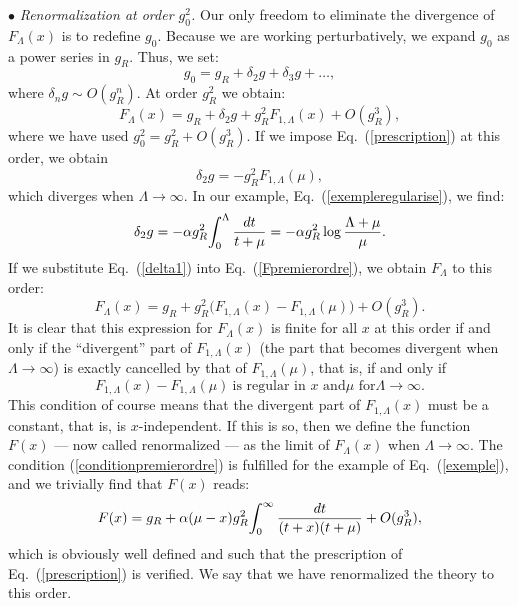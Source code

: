\documentclass[floatfix,twocolumn,preprintnumbers,amsmath,amssymb,prb]{revtex4}
\begin{document}
$\bullet$ {\it Renormalization at order $g_0^2$.} Our only freedom to eliminate the divergence of $F_\Lambda(x)$ is to redefine $g_0$. Because
we are working perturbatively, we expand $g_0$ as a power series
in $g_R$. Thus, we set:
\begin{equation}
g_0=g_R + \delta_2 g
+ \delta_3 g + \dots,
\end{equation}
where $\delta_n g \sim O(g_R^{n})$. At
order $g_R^2$ we obtain:
\begin{equation}
F_\Lambda(x)= g_R+ \delta_2 g +g_R^2 
F_{1,\Lambda}(x) + O(g_R^3),
\label{Fpremierordre}
\end{equation}
where we have used $g_0^2=g_R^2 +O(g_R^3)$. If we impose
Eq.~(\ref{prescription}) at this order, we obtain
\begin{equation}
\delta_2 g= - g_R^2 
F_{1,\Lambda}(\mu),
\label{delta1}
\end{equation}
which diverges when $\Lambda\to \infty$. In our example,
Eq.~(\ref{exempleregularise}), we find:
\begin{equation}
\delta_2 g= - \alpha g_R^2
\! \int_0^\Lambda {dt\over t+\mu}= -\alpha g_R^2 \log{\Lambda
+\mu\over\mu}.
\end{equation}
If we substitute Eq.~(\ref{delta1}) into Eq.~(\ref{Fpremierordre}),
we obtain $F_\Lambda$ to this order:
\begin{equation} 
F_\Lambda(x)= g_R + g_R^2 \big(F_{1,\Lambda}(x) -
F_{1,\Lambda}(\mu)\big) + O(g_R^3).
\label{Frenormalise2}
\end{equation}
It is clear that this expression for $F_\Lambda(x)$ is finite for
all
$x$ at this order if and only if the ``divergent'' part of
$F_{1,\Lambda}(x)$ (the part that becomes divergent when
$\Lambda\to\infty$) is exactly cancelled by that of
$F_{1,\Lambda}(\mu)$, that is, if and only if
\begin{equation}
F_{1,\Lambda}(x)-F_{1,\Lambda}(\mu)\ \mbox{is regular in $x$ and
$\mu$ for
$\Lambda\to\infty$.}
\label{conditionpremierordre}
\end{equation}
This condition of course means
that the divergent part of $F_{1,\Lambda}(x)$ must be a constant,
that is, is $x$-independent. If this is so, then we define the
function $F(x)$ --- now called renormalized --- as the limit of
$F_\Lambda(x)$ when
$\Lambda\to\infty$. The condition (\ref{conditionpremierordre}) is 
fulfilled for the
example of Eq.~(\ref{exemple}), and we trivially find that $F(x)$
reads:
\begin{equation}
F(x)= g_R +\alpha (\mu-x) g_R^2 \! \int_0^\infty {dt\over
(t+x)(t+\mu)} +O(g_R^3),
\end{equation}
which is obviously well defined and such that the prescription of
Eq.~(\ref{prescription}) is verified. We say that we have
renormalized the theory to this order.
\end{document}
